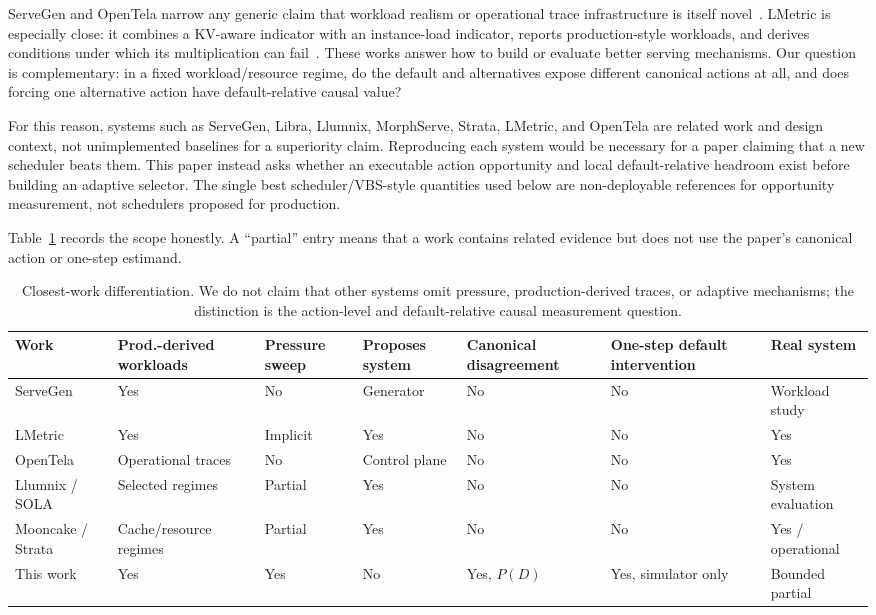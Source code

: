 \documentclass[preprint,12pt]{elsarticle}
\begin{document}
ServeGen and OpenTela narrow any generic claim that workload realism or
operational trace infrastructure is itself novel~\cite{servegen2025,opentela2026}.
LMetric is especially close: it combines a KV-aware indicator with an
instance-load indicator, reports production-style workloads, and derives
conditions under which its multiplication can fail~\cite{lmetric2026}. These
works answer how to build or evaluate better serving mechanisms. Our question
is complementary: in a fixed workload/resource regime, do the default and
alternatives expose different canonical actions at all, and does forcing one
alternative action have default-relative causal value?

For this reason, systems such as ServeGen, Libra, Llumnix, MorphServe,
Strata, LMetric, and OpenTela are related work and design context, not
unimplemented baselines for a superiority claim. Reproducing each system
would be necessary for a paper claiming that a new scheduler beats them. This
paper instead asks whether an executable action opportunity and local
default-relative headroom exist before building an adaptive selector. The
single best scheduler/VBS-style quantities used below are non-deployable references for
opportunity measurement, not schedulers proposed for production.

Table~\ref{tab:closest} records the scope honestly. A ``partial'' entry means
that a work contains related evidence but does not use the paper's canonical
action or one-step estimand.

\begin{table}[t]
\centering
\small
\caption{Closest-work differentiation. We do not claim that other systems
omit pressure, production-derived traces, or adaptive mechanisms; the distinction is
the action-level and default-relative causal measurement question.}
\label{tab:closest}
\setlength{\tabcolsep}{6pt}
\renewcommand{\arraystretch}{1.2}
\begin{tabular}{@{}p{}p{}p{}p{}p{}p{}p{}@{}}
\toprule
Work & Prod.-derived workloads & Pressure sweep & Proposes system & Canonical disagreement & One-step default intervention & Real system \\
\midrule
ServeGen & Yes & No & Generator & No & No & Workload study \\
LMetric & Yes & Implicit & Yes & No & No & Yes \\
OpenTela & Operational traces & No & Control plane & No & No & Yes \\
Llumnix / SOLA & Selected regimes & Partial & Yes & No & No & System evaluation \\
Mooncake / Strata & Cache/resource regimes & Partial & Yes & No & No & Yes / operational \\
This work & Yes & Yes & No & Yes, $P(D)$ & Yes, simulator only & Bounded partial \\
\bottomrule
\end{tabular}
\end{table}
\end{document}
